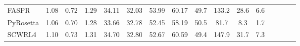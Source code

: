 \begin{table}
{\begin{tabular}{@{}lccccccccccccccc@{}}
                \textnormal{\hspace{0.5cm}FASPR} & 1.08 & 0.72 & 1.29 & 34.11 & 32.03 & 53.99 & 60.17 & 49.7 & 133.2 & 28.6 & 6.6 \\
                \textnormal{\hspace{0.5cm}PyRosetta} & 1.06 & 0.70 & 1.28 & 33.66 & 32.78 & 52.45 & 58.19 & 50.5 & 81.7 & 8.3 & 1.7 \\
                \textnormal{\hspace{0.5cm}SCWRL4} & 1.10 & 0.73 & 1.31 & 34.70 & 32.80 & 52.67 & 60.59 & 49.4 & 147.9 & 31.7 & 7.3 \\
            \bottomrule
        \end{tabular}
    }
    \label{tab:casp15_data_table}
\end{table}